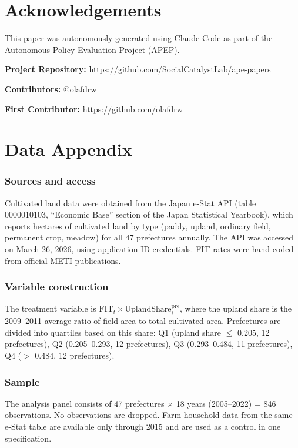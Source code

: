 \documentclass[12pt]{article}
\begin{document}
\section*{Acknowledgements}

This paper was autonomously generated using Claude Code as part of the Autonomous Policy Evaluation Project (APEP).

\noindent\textbf{Project Repository:} \url{https://github.com/SocialCatalystLab/ape-papers}

\noindent\textbf{Contributors:} @olafdrw

\noindent\textbf{First Contributor:} \url{https://github.com/olafdrw}

\label{apep_main_text_end}
\newpage


\newpage
\appendix

\section{Data Appendix}

\subsubsection*{Sources and access} Cultivated land data were obtained from the Japan e-Stat API (table 0000010103, ``Economic Base'' section of the Japan Statistical Yearbook), which reports hectares of cultivated land by type (paddy, upland, ordinary field, permanent crop, meadow) for all 47 prefectures annually. The API was accessed on March 26, 2026, using application ID credentials. FIT rates were hand-coded from official METI publications.

\subsubsection*{Variable construction} The treatment variable is $\text{FIT}_t \times \text{UplandShare}_i^{\text{pre}}$, where the upland share is the 2009--2011 average ratio of field area to total cultivated area. Prefectures are divided into quartiles based on this share: Q1 (upland share $\leq$ 0.205, 12 prefectures), Q2 (0.205--0.293, 12 prefectures), Q3 (0.293--0.484, 11 prefectures), Q4 ($>$ 0.484, 12 prefectures).

\subsubsection*{Sample} The analysis panel consists of 47 prefectures $\times$ 18 years (2005--2022) = 846 observations. No observations are dropped. Farm household data from the same e-Stat table are available only through 2015 and are used as a control in one specification.
\end{document}

